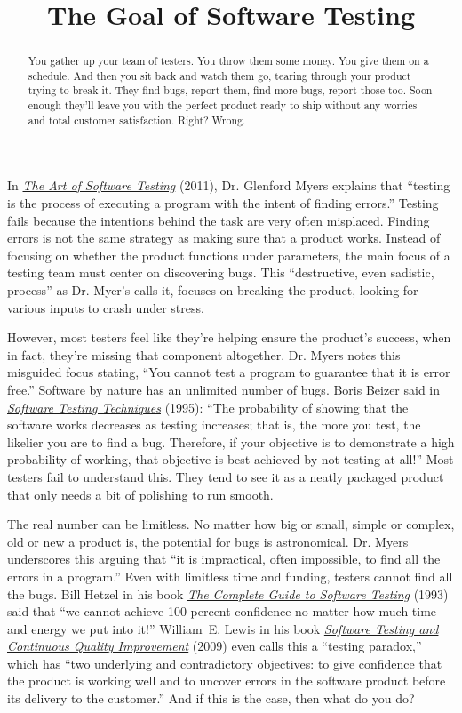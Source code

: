 \documentclass{main}
\title{The Goal of Software Testing}
\begin{document}
\begin{abstract}
You gather up your team of testers. You throw them some money. You give them on
a schedule. And then you sit back and watch them go, tearing through your
product trying to break it. They find bugs, report them, find more bugs, report
those too. Soon enough they’ll leave you with the perfect product ready to ship
without any worries and total customer satisfaction. Right? Wrong.
\end{abstract}

In \href{https://amzn.to/2L5lGXC}{\emph{The Art of Software Testing}} (2011), Dr. Glenford Myers explains that ``testing is the
process of executing a program with the intent of finding errors.''
Testing fails because the intentions behind the task are very often misplaced. Finding
errors is not the same strategy as making sure that a product works.
Instead of focusing on whether the product functions under parameters,
the main focus of a testing team must center on discovering bugs. This ``destructive, even sadistic,
process'' as Dr. Myer’s calls it, focuses on breaking the product, looking for
various inputs to crash under stress.

However, most testers feel like they're helping ensure the product's success, when in
fact, they're missing that component altogether.
Dr. Myers notes this misguided focus stating, ``You cannot test a program
to guarantee that it is error free.'' Software by nature has an
unlimited number of bugs. Boris Beizer said in
\href{https://amzn.to/2H5yuur}{\emph{Software Testing Techniques}} (1995):
``The probability of showing that the software works decreases as
testing increases; that is, the more you test, the likelier you
are to find a bug. Therefore, if your objective is to demonstrate
a high probability of working, that objective is best achieved by
not testing at all!''
Most testers fail to understand this. They tend
to see it as a neatly packaged product that only needs a bit of polishing to run smooth.

The real number can be limitless. No matter how big or small, simple or complex, old
or new a product is, the potential for bugs is astronomical.
Dr. Myers underscores this arguing that ``it is impractical,
often impossible, to find all the errors in a program.'' Even with limitless
time and funding, testers cannot find all the bugs.
Bill Hetzel in his book \href{https://amzn.to/2JhnLCd}{\emph{The Complete Guide to Software Testing}} (1993) said that
``we cannot achieve 100 percent confidence no matter how much time and energy we put into it!''
William~E. Lewis in his book
\href{https://amzn.to/2sqPvdg}{\emph{Software Testing and Continuous Quality Improvement}} (2009)
even calls this a ``testing paradox,'' which has
``two underlying and contradictory objectives: to give confidence that the product is working well and
to uncover errors in the software product before its delivery to the customer.''
And if this is the case, then what do you do?
\end{document}
